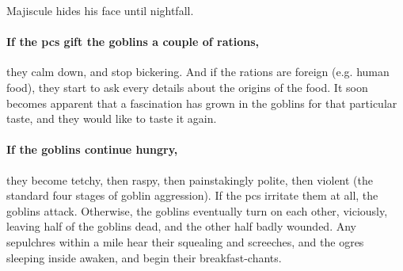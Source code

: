 Majiscule hides his face until nightfall.




\paragraph{If the \glspl{pc} gift the goblins a couple of \glspl{ration},}
they calm down, and stop bickering.
And if the \glspl{ration} are foreign (e.g. human food), they start to ask every details about the origins of the food.
It soon becomes apparent that a fascination has grown in the goblins for that particular taste, and they would like to taste it again.

\paragraph{If the goblins continue hungry,}
they become tetchy, then raspy, then painstakingly polite, then violent (the standard four stages of goblin aggression).
If the \glspl{pc} irritate them at all, the goblins attack.
Otherwise, the goblins eventually turn on each other, viciously, leaving half of the goblins dead, and the other half badly wounded.
Any \glspl{sepulchre} within a mile hear their squealing and screeches, and the \glspl{ogre} sleeping inside awaken, and begin their breakfast-chants.

